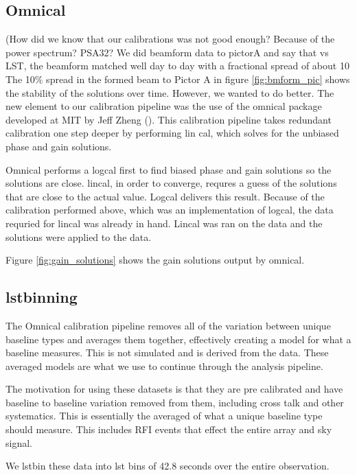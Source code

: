 \documentclass[twocolumn,numberedappendix]{emulateapj}
\begin{document}
\subsection{Omnical}
(How did we know that our calibrations was not good enough? Because of the power
spectrum? PSA32? We did beamform data to pictorA and say that vs LST, the
beamform matched well day to day with a fractional spread of about 10%
The 10$\%$ spread in the formed beam to Pictor A in figure \ref{fig:bmform_pic}
shows the stability of the solutions over time. However, we wanted to do better. 
The new element to our calibration pipeline was the use of the omnical package
developed at MIT by Jeff Zheng (\citep{zheng_et_al2014}). This calibration
pipeline takes redundant calibration one step deeper by performing lin cal,
which solves for the unbiased phase and gain solutions.  

Omnical performs a logcal first to find biased phase and gain solutions so the
solutions are close. lincal, in order to converge, requres a guess of the
solutions that are close to the actual value. Logcal delivers this result.
Because of the calibration performed above, which was an implementation of
logcal, the data requried for lincal was already in hand. Lincal was ran on the
data and the solutions were applied to the data.

Figure \ref{fig:gain_solutions} shows the gain solutions output by omnical. 
%

\subsection{lstbinning}
The Omnical calibration pipeline removes all of the variation between unique
baseline types and averages them together, effectively creating a model for what
a baseline measures. This is not simulated and is derived from the data. These
averaged models are what we use to continue through the analysis pipeline. 

The motivation for using these datasets is that they are pre calibrated and have
baseline to baseline variation removed from them, including cross talk and other
systematics. This is essentially the averaged of what a unique baseline type
should measure. This includes RFI events that effect the entire array and sky
signal. 

We lstbin these data into lst bins of 42.8 seconds over the entire observation.
\end{document}
